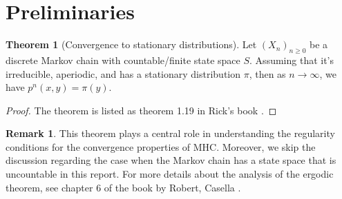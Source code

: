 \documentclass[]{article}
\theoremstyle{definition}
\newtheorem{theorem}{Theorem}       %
\newtheorem{remark}{Remark}[subsection]
{
    \newtheorem{assumption}{Assumption}
}
\begin{document}
\section{Preliminaries}\label{sec:preliminaries}
    \begin{theorem}[Convergence to stationary distributions]\label{thm:cvg_sta_distr}
        Let $(X_n)_{n\ge 0}$ be a discrete Markov chain with countable/finite state space $S$. Assuming that it's irreducible, aperiodic, and has a stationary distribution $\pi$, then as $n\rightarrow \infty$, we have $p^n(x, y) = \pi(y)$. 
    \end{theorem}
    \begin{proof}
        The theorem is listed as theorem 1.19 in Rick's book \cite{book:rick_essential}. 
    \end{proof}
    \begin{remark}
        This theorem plays a central role in understanding the regularity conditions for the convergence properties of MHC. Moreover, we skip the discussion regarding the case when the Markov chain has a state space that is uncountable in this report. For more details about the analysis of the ergodic theorem, see chapter 6 of the book by Robert, Casella \cite{book:robert_casella_2005}. 
    \end{remark}
\end{document}

